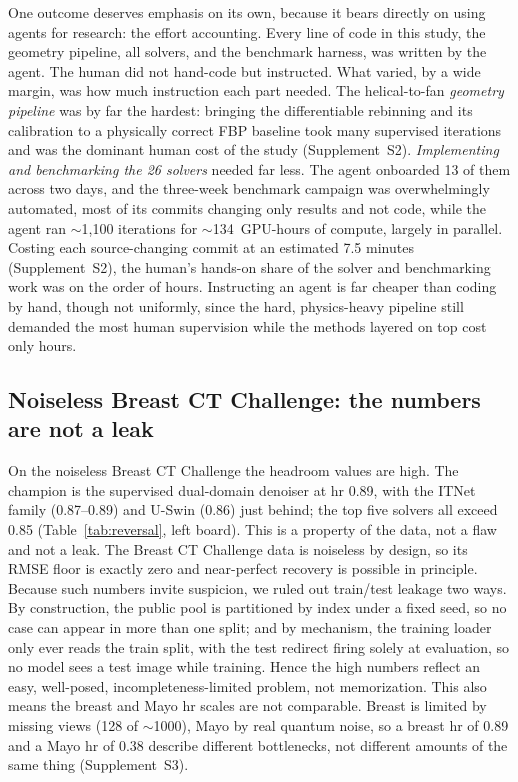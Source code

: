 \documentclass[AMA,twocolumn]{USG} %
\begin{document}
One outcome deserves emphasis on its own, because it bears directly on using agents for research: the effort accounting. Every line of code in this study, the geometry pipeline, all solvers, and the benchmark harness, was written by the agent. The human did not hand-code but instructed. What varied, by a wide margin, was how much instruction each part needed. The helical-to-fan \emph{geometry pipeline} was by far the hardest: bringing the differentiable rebinning and its calibration to a physically correct FBP baseline took many supervised iterations and was the dominant human cost of the study (Supplement~S2). \emph{Implementing and benchmarking the 26 solvers} needed far less. The agent onboarded 13 of them across two days, and the three-week benchmark campaign was overwhelmingly automated, most of its commits changing only results and not code, while the agent ran $\sim$1{,}100 iterations for $\sim$134~GPU-hours of compute, largely in parallel. Costing each source-changing commit at an estimated 7.5 minutes (Supplement~S2), the human's hands-on share of the solver and benchmarking work was on the order of hours. Instructing an agent is far cheaper than coding by hand, though not uniformly, since the hard, physics-heavy pipeline still demanded the most human supervision while the methods layered on top cost only hours.

\subsection{Noiseless Breast CT Challenge: the numbers are not a leak}\label{sec:noleak}

On the noiseless Breast CT Challenge the headroom values are high. The champion is the supervised dual-domain denoiser at hr 0.89, with the ITNet family (0.87--0.89) and U-Swin (0.86) just behind; the top five solvers all exceed 0.85 (Table~\ref{tab:reversal}, left board). This is a property of the data, not a flaw and not a leak. The Breast CT Challenge data is noiseless by design, so its RMSE floor is exactly zero and near-perfect recovery is possible in principle. Because such numbers invite suspicion, we ruled out train/test leakage two ways. By construction, the public pool is partitioned by index under a fixed seed, so no case can appear in more than one split; and by mechanism, the training loader only ever reads the train split, with the test redirect firing solely at evaluation, so no model sees a test image while training. Hence the high numbers reflect an easy, well-posed, incompleteness-limited problem, not memorization. This also means the breast and Mayo hr scales are not comparable. Breast is limited by missing views (128 of $\sim$1000), Mayo by real quantum noise, so a breast hr of 0.89 and a Mayo hr of 0.38 describe different bottlenecks, not different amounts of the same thing (Supplement~S3).
\end{document}
